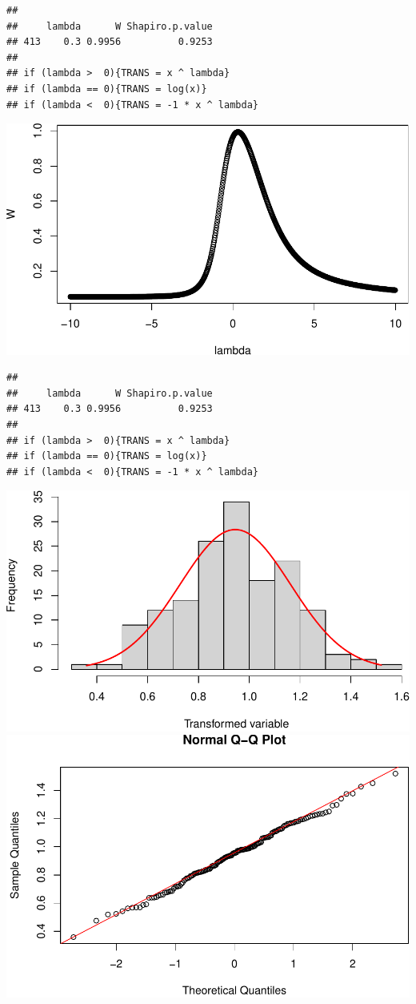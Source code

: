 \documentclass[11pt,]{article}
\begin{document}
\begin{verbatim}
## 
##     lambda      W Shapiro.p.value
## 413    0.3 0.9956          0.9253
## 
## if (lambda >  0){TRANS = x ^ lambda} 
## if (lambda == 0){TRANS = log(x)} 
## if (lambda <  0){TRANS = -1 * x ^ lambda}
\end{verbatim}

\includegraphics{proyecto_files/figure-latex/unnamed-chunk-18-4.pdf}

\begin{verbatim}
## 
##     lambda      W Shapiro.p.value
## 413    0.3 0.9956          0.9253
## 
## if (lambda >  0){TRANS = x ^ lambda} 
## if (lambda == 0){TRANS = log(x)} 
## if (lambda <  0){TRANS = -1 * x ^ lambda}
\end{verbatim}

\includegraphics{proyecto_files/figure-latex/unnamed-chunk-18-5.pdf}
\includegraphics{proyecto_files/figure-latex/unnamed-chunk-18-6.pdf}
\end{document}
